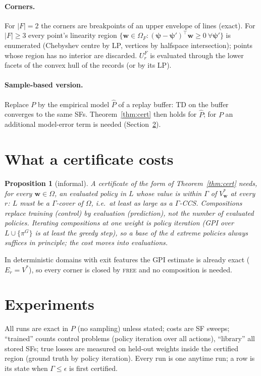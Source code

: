 \documentclass[11pt]{article}
\newcommand{\vpsi}{\bm{\psi}}
\newcommand{\w}{\mathbf{w}}
\newtheorem{proposition}{Proposition}
\theoremstyle{definition}
\begin{document}
\paragraph{Corners.} For $|F|=2$ the corners are breakpoints of an upper envelope of lines (exact). For $|F|\ge3$ every
point's linearity region $\{\w\in\Omega_F:(\vpsi-\vpsi')^\top\w\ge0\ \forall\vpsi'\}$ is enumerated (Chebyshev centre by
LP, vertices by halfspace intersection); points whose region has no interior are discarded. $U^F_r$ is evaluated
through the lower facets of the convex hull of the records (or by its LP).

\paragraph{Sample-based version.} Replace $P$ by the empirical model $\hat P$ of a replay buffer: TD on the buffer
converges to the same SFs. Theorem~\ref{thm:cert} then holds for $\hat P$; for $P$ an additional model-error term is
needed (Section~\ref{sec:exp}).

\section{What a certificate costs}\label{sec:cost}

\begin{proposition}[informal]
A certificate of the form of Theorem~\ref{thm:cert} needs, for every $\w\in\Omega$, an evaluated policy in $L$ whose value
is within $\Gamma$ of $V^*_\w$ at every $r$: $L$ must be a $\Gamma$-cover of $\Omega$, i.e.\ at least as large as a
$\Gamma$-CCS. Compositions replace \emph{training} (control) by \emph{evaluation} (prediction), not the number of
evaluated policies. Iterating compositions at one weight is policy iteration (GPI over $L\cup\{\pi^G\}$ is at least
the greedy step), so a base of the $d$ extreme policies always suffices in principle; the cost moves into evaluations.
\end{proposition}
\noindent In deterministic domains with exit features the GPI estimate is already exact ($E_r=V^*$), so every corner
is closed by \textsc{free} and no composition is needed.

\section{Experiments}\label{sec:exp}
All runs are exact in $P$ (no sampling) unless stated; costs are SF sweeps; ``trained'' counts control problems
(policy iteration over all actions), ``library'' all stored SFs; true losses are measured on held-out weights inside
the certified region (ground truth by policy iteration). Every run is one anytime run; a row is its state when
$\Gamma\le\epsilon$ is first certified.
\end{document}
